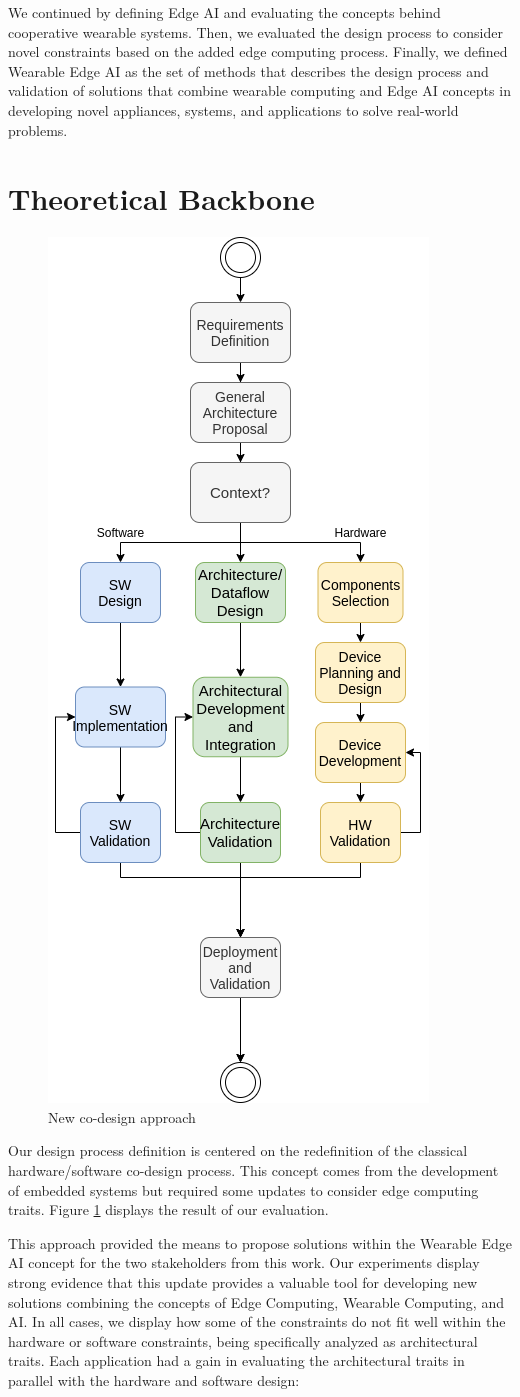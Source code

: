 We continued by defining Edge AI and evaluating the concepts behind cooperative wearable systems. Then, we evaluated the design process to consider novel constraints based on the added edge computing process. Finally, we defined Wearable Edge AI as the set of methods that describes the design process and validation of solutions that combine wearable computing and Edge AI concepts in developing novel appliances, systems, and applications to solve real-world problems.

\section{Theoretical Backbone}

\begin{figure}[h!]
    \centering
    \includegraphics[width = .37\linewidth]{Figures/codesign-2.0.png}
    \caption{New co-design approach}
    \label{fig:codesign-conclusion}
\end{figure}

Our design process definition is centered on the redefinition of the classical hardware/software co-design process. This concept comes from the development of embedded systems but required some updates to consider edge computing traits. Figure \ref{fig:codesign-conclusion} displays the result of our evaluation.

This approach provided the means to propose solutions within the Wearable Edge AI concept for the two stakeholders from this work. Our experiments display strong evidence that this update provides a valuable tool for developing new solutions combining the concepts of Edge Computing, Wearable Computing, and AI. In all cases, we display how some of the constraints do not fit well within the hardware or software constraints, being specifically analyzed as architectural traits. Each application had a gain in evaluating the architectural traits in parallel with the hardware and software design:

